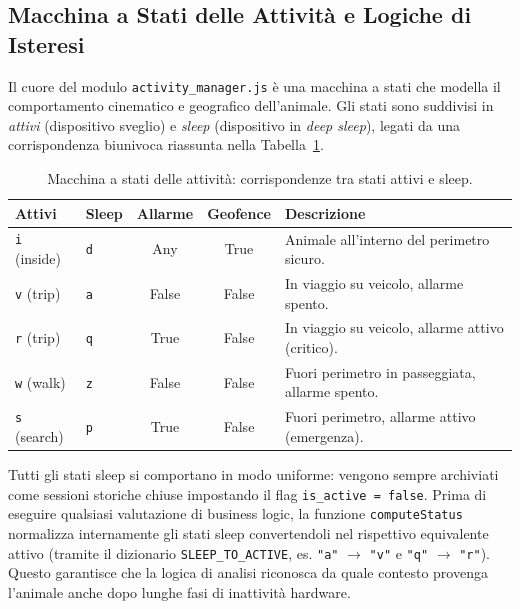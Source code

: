 \documentclass[12pt,a4paper]{article}
\begin{document}
\subsection{Macchina a Stati delle Attività e Logiche di Isteresi}
Il cuore del modulo \texttt{activity\_manager.js} è una macchina a stati che modella il comportamento cinematico e geografico dell'animale. Gli stati sono suddivisi in \textit{attivi} (dispositivo sveglio) e \textit{sleep} (dispositivo in \textit{deep sleep}), legati da una corrispondenza biunivoca riassunta nella Tabella~\ref{tab:stati}.
\begin{table}[H]
\centering
\small
\begin{tabularx}{\textwidth}{m{2.3cm}m{2.1cm}ccX}
\toprule
\textbf{Attivi} & \textbf{Sleep} & \textbf{Allarme} & \textbf{Geofence} & \textbf{Descrizione} \\ \midrule
\texttt{i} (inside)   & \texttt{d}           & Any                     & True              & Animale all'interno del perimetro sicuro. \\
\texttt{v} (trip) & \texttt{a}           & False                   & False             & In viaggio su veicolo, allarme spento. \\ 
\texttt{r} (trip)  & \texttt{q}           & True                    & False             & In viaggio su veicolo, allarme attivo (critico). \\
\texttt{w} (walk)     & \texttt{z}           & False                   & False             & Fuori perimetro in passeggiata, allarme spento. \\
\texttt{s} (search)   & \texttt{p}           & True                    & False             & Fuori perimetro, allarme attivo (emergenza). \\ \bottomrule
\end{tabularx}
\caption{Macchina a stati delle attività: corrispondenze tra stati attivi e sleep.}
\label{tab:stati}
\end{table}
Tutti gli stati sleep si comportano in modo uniforme: vengono sempre archiviati come sessioni storiche chiuse impostando il flag \texttt{is\_active = false}. Prima di eseguire qualsiasi valutazione di business logic, la funzione \texttt{computeStatus} normalizza internamente gli stati sleep convertendoli nel rispettivo equivalente attivo (tramite il dizionario \texttt{SLEEP\_TO\_ACTIVE}, es. \texttt{"a"} $\to$ \texttt{"v"} e \texttt{"q"} $\to$ \texttt{"r"}). Questo garantisce che la logica di analisi riconosca da quale contesto provenga l'animale anche dopo lunghe fasi di inattività hardware.
\end{document}
